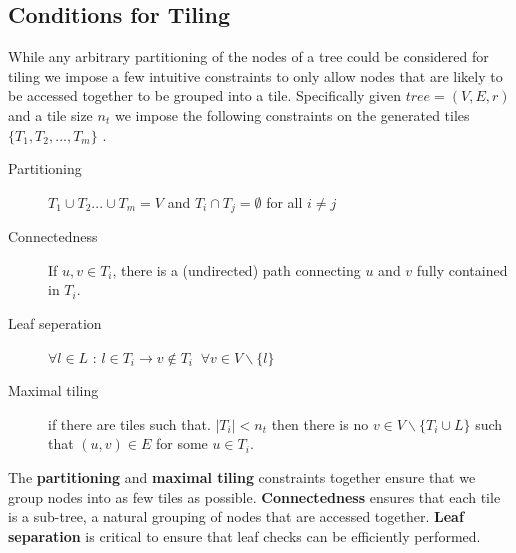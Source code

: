 \subsection{Conditions for Tiling}
\label{sec:ValidTiling}
While any arbitrary partitioning of the nodes of a tree could be considered for tiling we impose a few intuitive constraints to only allow nodes that are likely to be accessed together to be grouped into a tile. 
Specifically given $tree = (V, E, r)$ and a tile size $n_t$ we impose the following constraints on the generated tiles $\{ T_1, T_2, ... ,T_m \}$ .
\begin{description}
    \item[Partitioning] $T_1 \cup T_2 ... \cup T_m = V$ and $T_i \cap T_j = \emptyset$ for all $i\neq j$
    \item[Connectedness] If $u, v \in T_i$, there is a (undirected) path connecting $u$ and $v$ fully contained in $T_i$.
   \item [Leaf seperation] $\forall l \in L$ : $l \in T_i \rightarrow v \notin T_i \;\; \forall v \in V \backslash \{l\}$
  \item [Maximal tiling] if there are tiles such that. $|T_i| < n_t$ then there is no $v \in V\backslash \{ T_i \cup L \}$ such that $(u, v) \in E$ for some $u \in T_i$. 
\end{description}
The \textbf{partitioning} and \textbf{maximal tiling} constraints together ensure that we group nodes into as few tiles as possible. {\textbf{Connectedness}} ensures that each tile is a sub-tree, a natural grouping of nodes that are accessed together. {\textbf{Leaf separation}} is critical to ensure that leaf checks can be efficiently performed.
